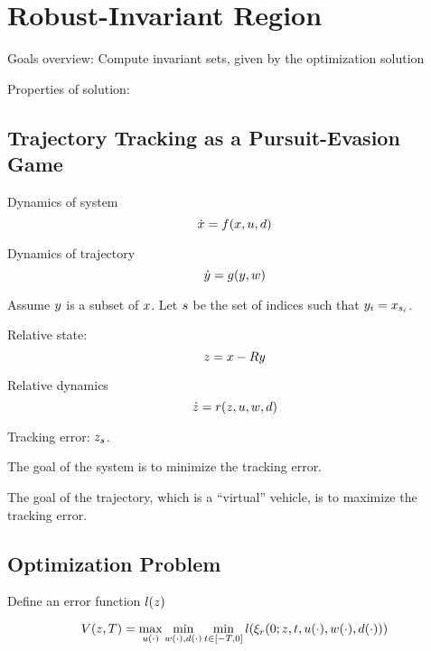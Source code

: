 \section{Robust-Invariant Region \label{sec:reachability}}
Goals overview: Compute invariant sets, given by the optimization solution

Properties of solution: 

\subsection{Trajectory Tracking as a Pursuit-Evasion Game}
Dynamics of system
\begin{equation}
\dot{x} = f(x, u, d)
\end{equation}

Dynamics of trajectory
\begin{equation}
\dot{y} = g(y, w)
\end{equation}

Assume $y$ is a subset of $x$. Let $s$ be the set of indices such that $y_i = x_{s_i}$.

Relative state:
\begin{equation}
z = x - Ry
\end{equation}

Relative dynamics
\begin{equation}
\dot{z} = r(z, u, w, d)
\end{equation}

Tracking error: $z_{s}$.

The goal of the system is to minimize the tracking error.

The goal of the trajectory, which is a ``virtual'' vehicle, is to maximize the tracking error.

\subsection{Optimization Problem}
Define an error function $l(z)$

\begin{equation}
V(z, T) = \max_{u(\cdot)} \min_{w(\cdot), d(\cdot)} \min_{t \in [-T, 0]} l(\xi_r(0; z, t, u(\cdot), w(\cdot), d(\cdot))) 
\end{equation}

%

